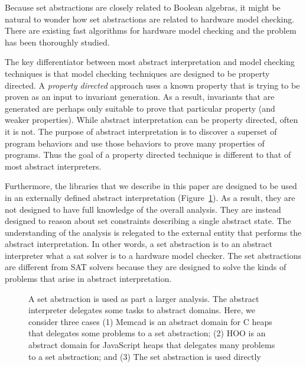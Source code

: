 Because set abstractions are closely related to Boolean algebras, it might be natural to wonder how set abstractions are related to hardware model checking.  There are existing fast algorithms for hardware model checking and the problem has been thoroughly studied.

The key differentiator between most abstract interpretation and model checking techniques is that model checking techniques are designed to be property directed.  A \emph{property directed} approach uses a known property that is trying to be proven as an input to invariant generation.  As a result, invariants that are generated are perhaps only suitable to prove that particular property (and weaker properties).  While abstract interpretation can be property directed, often it is not.  The purpose of abstract interpretation is to discover a superset of program behaviors and use those behaviors to prove many properties of programs.  Thus the goal of a property directed technique is different to that of most abstract interpreters.

Furthermore, the libraries that we describe in this paper are designed to be used in an externally defined abstract interpretation (Figure~\ref{fig:domain-usage}).  As a result, they are not designed to have full knowledge of the overall analysis.  They are instead designed to reason about set constraints describing a single abstract state.  The understanding of the analysis is relegated to the external entity that performs the abstract interpretation.  In other words, a set abstraction is to an abstract interpreter what a sat solver is to a hardware model checker.  The set abstractions are different from SAT solvers because they are designed to solve the kinds of problems that arise in abstract interpretation.

\begin{figure}[tb]
    \centering
    \caption{A set abstraction is used as part a larger analysis.  The abstract interpreter delegates some tasks to abstract domains.  Here, we consider three cases (1) Memcad is an abstract domain for C heaps that delegates some problems to a set abstraction; (2) HOO is an abstract domain for JavaScript heaps that delegates many problems to a set abstraction; and (3) The set abstraction is used directly}
    \label{fig:domain-usage}
\end{figure}

